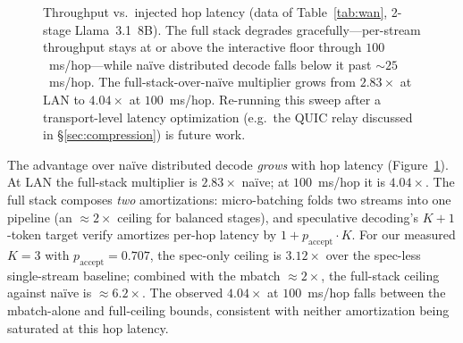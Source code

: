 \documentclass[11pt]{article}
\begin{document}
\begin{figure}[ht]
\centering
{}
\caption{Throughput vs.\ injected hop latency (data of Table~\ref{tab:wan}, 2-stage Llama~3.1~8B). The full stack degrades gracefully---per-stream throughput stays at or above the interactive floor through $100$~ms/hop---while na\"ive distributed decode falls below it past ${\sim}25$~ms/hop. The full-stack-over-na\"ive multiplier grows from $2.83\times$ at LAN to $4.04\times$ at $100$~ms/hop. Re-running this sweep after a transport-level latency optimization (e.g.\ the QUIC relay discussed in \S\ref{sec:compression}) is future work.}
\label{fig:wan_plot}
\end{figure}

The advantage over naïve distributed decode \emph{grows} with hop latency (Figure~\ref{fig:wan_plot}). At LAN the full-stack multiplier is $2.83\times$ naïve; at $100$~ms/hop it is $4.04\times$. The full stack composes \emph{two} amortizations: micro-batching folds two streams into one pipeline (an $\approx 2\times$ ceiling for balanced stages), and speculative decoding's $K+1$-token target verify amortizes per-hop latency by $1+p_\text{accept}\cdot K$. For our measured $K\!=\!3$ with $p_\text{accept}\!=\!0.707$, the spec-only ceiling is $3.12\times$ over the spec-less single-stream baseline; combined with the mbatch $\approx 2\times$, the full-stack ceiling against naïve is $\approx 6.2\times$. The observed $4.04\times$ at $100$~ms/hop falls between the mbatch-alone and full-ceiling bounds, consistent with neither amortization being saturated at this hop latency.
\end{document}
